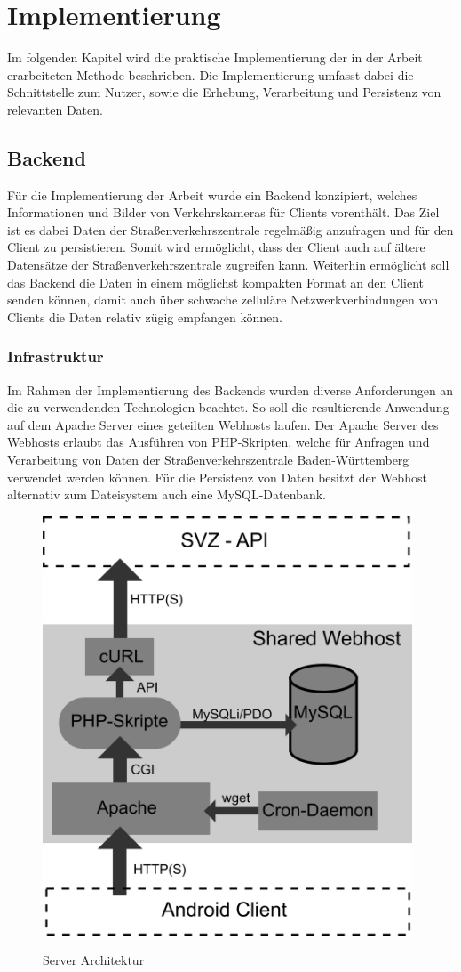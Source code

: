 \chapter{Implementierung}
Im folgenden Kapitel wird die praktische Implementierung der in der Arbeit erarbeiteten Methode beschrieben. Die Implementierung umfasst dabei die Schnittstelle zum Nutzer, sowie die Erhebung, Verarbeitung und Persistenz von relevanten Daten.
\section{Backend}
Für die Implementierung der Arbeit wurde ein Backend konzipiert, welches Informationen und Bilder von Verkehrskameras für Clients vorenthält. Das Ziel ist es dabei Daten der Straßenverkehrszentrale regelmäßig anzufragen und für den Client zu persistieren. Somit wird ermöglicht, dass der Client auch auf ältere Datensätze der Straßenverkehrszentrale zugreifen kann. Weiterhin ermöglicht soll das Backend die Daten in einem möglichst kompakten Format an den Client senden können, damit auch über schwache zelluläre Netzwerkverbindungen von Clients die Daten relativ zügig empfangen können. 
\subsection{Infrastruktur}
Im Rahmen der Implementierung des Backends wurden diverse Anforderungen an die zu verwendenden Technologien beachtet. So soll die resultierende Anwendung auf dem Apache Server eines geteilten Webhosts laufen. Der Apache Server des Webhosts erlaubt das Ausführen von PHP-Skripten, welche für Anfragen und Verarbeitung von Daten der Straßenverkehrszentrale Baden-Württemberg verwendet werden können. Für die Persistenz von Daten besitzt der Webhost alternativ zum Dateisystem auch eine MySQL-Datenbank.
\begin{figure}[ht]
   \centering
     \includegraphics[width=11cm]{Bilder/server-arch} \\
 \caption{Server Architektur}
 \label{fig:serverarch}
\end{figure}

